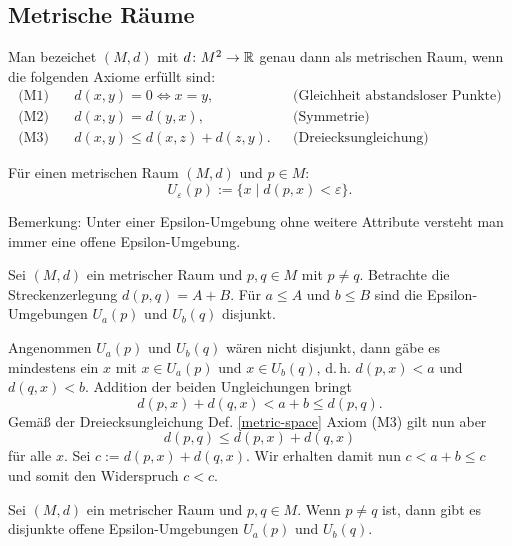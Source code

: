 \subsection{Metrische Räume}
\begin{Definition}%
\label{metric-space}
Man bezeichet $(M,d)$ mit $d\colon M^2\to\mathbb R$ genau dann als
metrischen Raum, wenn die folgenden Axiome erfüllt sind:
\begin{align*}
\text{(M1)}\quad & d(x,y)=0\iff x=y, &&\text{(Gleichheit abstandsloser Punkte)}\\
\text{(M2)}\quad & d(x,y)=d(y,x), &&\text{(Symmetrie)}\\
\text{(M3)}\quad & d(x,y)\le d(x,z)+d(z,y). &&\text{(Dreiecksungleichung)}
\end{align*}
\end{Definition}

\begin{Definition}\newlinefirst
Für einen metrischen Raum $(M,d)$ und $p\in M$:
\[U_\varepsilon(p) := \{x\mid d(p,x)<\varepsilon\}.\]
\end{Definition}
Bemerkung: Unter einer Epsilon-Umgebung ohne weitere Attribute
versteht man immer eine offene Epsilon-Umgebung.

\begin{Satz}%
\label{construction-disjoint-ep-balls}
Sei $(M,d)$ ein metrischer Raum und $p,q\in M$ mit $p\ne q$.
Betrachte die Streckenzerlegung $d(p,q)=A+B$. Für $a\le A$ und
$b\le B$ sind die Epsilon-Umgebungen $U_a(p)$ und $U_b(q)$ disjunkt.
\end{Satz}

\begin{Beweis}
Angenommen $U_a(p)$ und $U_b(q)$ wären nicht disjunkt, dann gäbe
es mindestens ein $x$ mit $x\in U_a(p)$ und $x\in U_b(q)$, d.\,h.
$d(p,x)<a$ und $d(q,x)<b$. Addition der beiden Ungleichungen
bringt
\[d(p,x)+d(q,x)<a+b\le d(p,q).\]
Gemäß der Dreiecksungleichung Def. \ref{metric-space} Axiom (M3) gilt
nun aber
\[d(p,q)\le d(p,x)+d(q,x)\]
für alle $x$. Sei $c:=d(p,x)+d(q,x)$. Wir erhalten damit nun
$c<a+b\le c$ und somit den Widerspruch $c<c$.\,\qedsymbol
\end{Beweis}

\begin{Satz}
Sei $(M,d)$ ein metrischer Raum und $p,q\in M$.
Wenn $p\ne q$ ist, dann gibt es disjunkte offene
Epsilon-Umgebungen $U_a(p)$ und $U_b(q)$.
\end{Satz}

